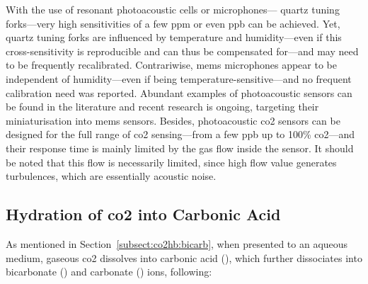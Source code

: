 With the use of resonant photoacoustic cells or microphones---\eg{} quartz tuning forks---very high sensitivities of a few ppm or even ppb can be achieved\cite{borri2014}. Yet, quartz tuning forks are influenced by temperature and humidity---even if this cross-sensitivity is reproducible and can thus be compensated for---and may need to be frequently recalibrated\cite{rousseau2019}. Contrariwise, \gls{mems} microphones appear to be independent of humidity---even if being temperature-sensitive---and no frequent calibration need was reported\cite{scholz2017}. Abundant examples of photoacoustic sensors can be found in the literature\cite{huber2015, pernau2016, scholz2017} and recent research is ongoing, targeting their miniaturisation into \gls{mems} sensors\cite{lhermet2019}. Besides, photoacoustic \gls{co2} sensors can be designed for the full range of \gls{co2} sensing---from a few ppb up to 100\% \gls{co2}---and their response time is mainly limited by the gas flow inside the sensor. It should be noted that this flow is necessarily limited, since high flow value generates turbulences, which are essentially acoustic noise\cite{bozoki2011}.

\subsection{Hydration of \texorpdfstring{\gls{co2}}{CO2} into Carbonic Acid}\label{subsect:choos:review:hydration}

As mentioned in Section~\ref{subsect:co2hb:bicarb}, when presented to an aqueous medium, gaseous \gls{co2} dissolves into carbonic acid (), which further dissociates into bicarbonate () and carbonate () ions, following\cite{jensen1979, mills2009}:

